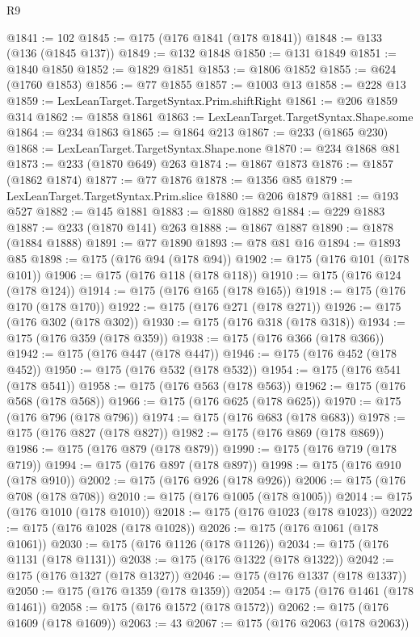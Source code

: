 \begin{lexlean}{R9}
\begin{coremodule}
{{{{{{{{{{{{{{{{{{{{{{{{{{{{{{{{{{{{{{{{{{{{{{{{{{{{{{{{{{{{{{{{{{{{{{{{{{{{{{{{{{{{{{{{{{{{{{{{{{{{{{{{{{{{@1841 := 102
@1845 := @175 (@176 @1841 (@178 @1841))
@1848 := @133 (@136 (@1845 @137))
@1849 := @132 @1848
@1850 := @131 @1849
@1851 := @1840 @1850
@1852 := @1829 @1851
@1853 := @1806 @1852
@1855 := @624 (@1760 @1853)
@1856 := @77 @1855
@1857 := @1003 @13
@1858 := @228 @13
@1859 := LexLeanTarget.TargetSyntax.Prim.shiftRight
@1861 := @206 @1859 @314
@1862 := @1858 @1861
@1863 := LexLeanTarget.TargetSyntax.Shape.some
@1864 := @234 @1863
@1865 := @1864 @213
@1867 := @233 (@1865 @230)
@1868 := LexLeanTarget.TargetSyntax.Shape.none
@1870 := @234 @1868 @81
@1873 := @233 (@1870 @649) @263
@1874 := @1867 @1873
@1876 := @1857 (@1862 @1874)
@1877 := @77 @1876
@1878 := @1356 @85
@1879 := LexLeanTarget.TargetSyntax.Prim.slice
@1880 := @206 @1879
@1881 := @193 @527
@1882 := @145 @1881
@1883 := @1880 @1882
@1884 := @229 @1883
@1887 := @233 (@1870 @141) @263
@1888 := @1867 @1887
@1890 := @1878 (@1884 @1888)
@1891 := @77 @1890
@1893 := @78 @81 @16
@1894 := @1893 @85
@1898 := @175 (@176 @94 (@178 @94))
@1902 := @175 (@176 @101 (@178 @101))
@1906 := @175 (@176 @118 (@178 @118))
@1910 := @175 (@176 @124 (@178 @124))
@1914 := @175 (@176 @165 (@178 @165))
@1918 := @175 (@176 @170 (@178 @170))
@1922 := @175 (@176 @271 (@178 @271))
@1926 := @175 (@176 @302 (@178 @302))
@1930 := @175 (@176 @318 (@178 @318))
@1934 := @175 (@176 @359 (@178 @359))
@1938 := @175 (@176 @366 (@178 @366))
@1942 := @175 (@176 @447 (@178 @447))
@1946 := @175 (@176 @452 (@178 @452))
@1950 := @175 (@176 @532 (@178 @532))
@1954 := @175 (@176 @541 (@178 @541))
@1958 := @175 (@176 @563 (@178 @563))
@1962 := @175 (@176 @568 (@178 @568))
@1966 := @175 (@176 @625 (@178 @625))
@1970 := @175 (@176 @796 (@178 @796))
@1974 := @175 (@176 @683 (@178 @683))
@1978 := @175 (@176 @827 (@178 @827))
@1982 := @175 (@176 @869 (@178 @869))
@1986 := @175 (@176 @879 (@178 @879))
@1990 := @175 (@176 @719 (@178 @719))
@1994 := @175 (@176 @897 (@178 @897))
@1998 := @175 (@176 @910 (@178 @910))
@2002 := @175 (@176 @926 (@178 @926))
@2006 := @175 (@176 @708 (@178 @708))
@2010 := @175 (@176 @1005 (@178 @1005))
@2014 := @175 (@176 @1010 (@178 @1010))
@2018 := @175 (@176 @1023 (@178 @1023))
@2022 := @175 (@176 @1028 (@178 @1028))
@2026 := @175 (@176 @1061 (@178 @1061))
@2030 := @175 (@176 @1126 (@178 @1126))
@2034 := @175 (@176 @1131 (@178 @1131))
@2038 := @175 (@176 @1322 (@178 @1322))
@2042 := @175 (@176 @1327 (@178 @1327))
@2046 := @175 (@176 @1337 (@178 @1337))
@2050 := @175 (@176 @1359 (@178 @1359))
@2054 := @175 (@176 @1461 (@178 @1461))
@2058 := @175 (@176 @1572 (@178 @1572))
@2062 := @175 (@176 @1609 (@178 @1609))
@2063 := 43
@2067 := @175 (@176 @2063 (@178 @2063))
}}}}}}}}}}}}}}}}}}}}}}}}}}}}}}}}}}}}}}}}}}}}}}}}}}}}}}}}}}}}}}}}}}}}}}}}}}}}}}}}}}}}}}}}}}}}}}}}}}}}}}}}}}}}
\end{coremodule}
\end{lexlean}

